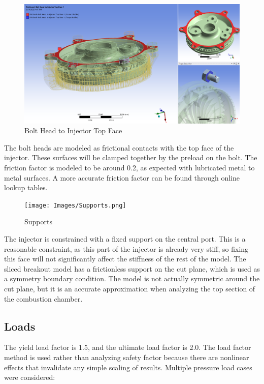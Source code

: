 \begin{figure}
    \centering
    \includegraphics[width=1\linewidth]{Images/Bolt Heat to Injector Top Face.png}
    \caption{Bolt Head to Injector Top Face}
    \label{fig:Bolt Head to Injector Top Face}
\end{figure}
The bolt heads are modeled as frictional contacts with the top face of the injector. These surfaces will be clamped together by the preload on the bolt. The friction factor is modeled to be around 0.2, as expected with lubricated metal to metal surfaces.  A more accurate friction factor can be found through online lookup tables. 
\begin{figure}
    \centering
    \texttt{[image: Images/Supports.png]}
    \caption{Supports}
    \label{fig:Supports}
\end{figure}
The injector is constrained with a fixed support on the central port. This is a reasonable constraint, as this part of the injector is already very stiff, so fixing this face will not significantly affect the stiffness of the rest of the model. 
The sliced breakout model has a frictionless support on the cut plane, which is used as a symmetry boundary condition. The model is not actually symmetric around the cut plane, but it is an accurate approximation when analyzing the top section of the combustion chamber. 

\subsection{Loads}
The yield load factor is 1.5, and the ultimate load factor is 2.0. The load factor method is used rather than analyzing safety factor because there are nonlinear effects that invalidate any simple scaling of results. Multiple pressure load cases were considered:

